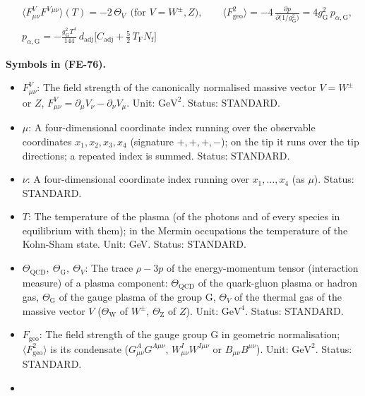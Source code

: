 \documentclass[
  10pt,
]{article}
\providecommand{\tightlist}{%
  \setlength{\itemsep}{0pt}\setlength{\parskip}{0pt}}
\begin{document}
\[
\begin{aligned}
&\big\langle F^V_{\mu\nu}F^{V}{}^{\mu\nu}\big\rangle(T) = -2\,\Theta_V\ \ \text{(for $V = W^\pm, Z$)},\qquad
 \big\langle F_{\mathrm{geo}}^2\big\rangle = -4\,\frac{\partial p}{\partial\big(1/g_{\mathrm{G}}^2\big)}
 = 4g_{\mathrm{G}}^2\,p_{\alpha,\mathrm{G}},\\
&p_{\alpha,\mathrm{G}} = -\frac{g_{\mathrm{G}}^2T^4}{144}\,d_{\mathrm{adj}}\Big[C_{\mathrm{adj}} +
 \frac52\,T_{\mathrm{F}}N_{\mathrm{f}}\Big]
\end{aligned} \tag{FE-76}
\]

\textbf{Symbols in (FE-76).}

\begin{itemize}
\tightlist
\item
  \(F^V_{\mu\nu}\): The field strength of the canonically normalised
  massive vector \(V = W^\pm\) or \(Z\),
  \(F^V_{\mu\nu} = \partial_\mu V_\nu - \partial_\nu V_\mu\). Unit:
  \(\mathrm{GeV}^{2}\). Status: STANDARD.
\item
  \(\mu\): A four-dimensional coordinate index running over the
  observable coordinates \(x_1, x_2, x_3, x_4\) (signature \(+,+,+,-\));
  on the tip it runs over the tip directions; a repeated index is
  summed. Status: STANDARD.
\item
  \(\nu\): A four-dimensional coordinate index running over
  \(x_1, \dots, x_4\) (as \(\mu\)). Status: STANDARD.
\item
  \(T\): The temperature of the plasma (of the photons and of every
  species in equilibrium with them); in the Mermin occupations the
  temperature of the Kohn-Sham state. Unit: GeV. Status: STANDARD.
\item
  \(\Theta_{\mathrm{QCD}},\ \Theta_{\mathrm{G}},\ \Theta_V\): The trace
  \(\rho - 3p\) of the energy-momentum tensor (interaction measure) of a
  plasma component: \(\Theta_{\mathrm{QCD}}\) of the quark-gluon plasma
  or hadron gas, \(\Theta_{\mathrm{G}}\) of the gauge plasma of the
  group G, \(\Theta_V\) of the thermal gas of the massive vector \(V\)
  (\(\Theta_{\mathrm{W}}\) of \(W^\pm\), \(\Theta_{\mathrm{Z}}\) of
  \(Z\)). Unit: \(\mathrm{GeV}^{4}\). Status: STANDARD.
\item
  \(F_{\mathrm{geo}}\): The field strength of the gauge group G in
  geometric normalisation; \(\langle F_{\mathrm{geo}}^2\rangle\) is its
  condensate (\(G^A_{\mu\nu}G^{A\mu\nu}\), \(W^I_{\mu\nu}W^{I\mu\nu}\)
  or \(B_{\mu\nu}B^{\mu\nu}\)). Unit: \(\mathrm{GeV}^{2}\). Status:
  STANDARD.
\item

\end{itemize}
\end{document}
